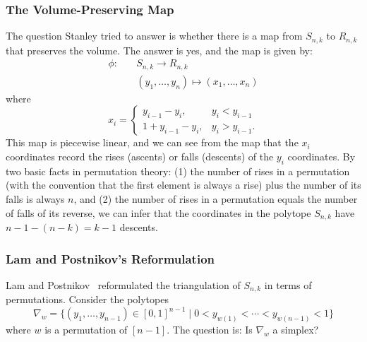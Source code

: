 \documentclass[12pt]{article}
\theoremstyle{definition}
\numberwithin{equation}{subsection}
\begin{document}
\subsubsection{The Volume-Preserving Map}
The question Stanley tried to answer is whether there is a map from $S_{n,k}$ to $R_{n,k}$ that preserves the volume. The answer is yes, and the map is given by:
\[
\begin{aligned}
    \phi: \quad & S_{n,k} \longrightarrow R_{n,k} \\
    & (y_1, \ldots, y_n) \longmapsto (x_1, \ldots, x_n)
\end{aligned}
\]
where
\[
x_i =
\begin{cases}
y_{i-1} - y_i, & y_i < y_{i-1} \\
1 + y_{i-1} - y_i, & y_i > y_{i-1}.
\end{cases}
\]
This map is piecewise linear, and we can see from the map that the $x_i$ coordinates record the rises (ascents) or falls (descents) of the $y_i$ coordinates. By two basic facts in permutation theory: (1) the number of rises in a permutation (with the convention that the first element is always a rise) plus the number of its falls is always $n$, and (2) the number of rises in a permutation equals the number of falls of its reverse, we can infer that the coordinates in the polytope $S_{n,k}$ have $n - 1 - (n - k) = k-1$ descents.

\subsubsection{Lam and Postnikov's Reformulation}

Lam and Postnikov~\cite{LP07} reformulated the triangulation of $S_{n,k}$ in terms of permutations. Consider the polytopes 
\[
\nabla_w = \{(y_1,\dots,y_{n-1})\in [0,1]^{n-1} \mid 0 < y_{w(1)} < \cdots < y_{w(n-1)} < 1\}
\]
where $w$ is a permutation of $[n-1]$. The question is: Is $\nabla_w$ a simplex?
\end{document}
